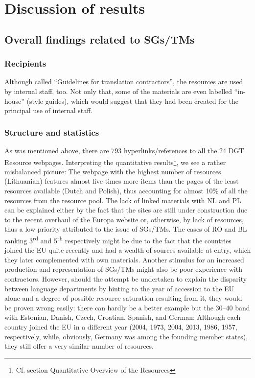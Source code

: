 \documentclass[output=paper]{langsci/langscibook}
\begin{document}
\section{Discussion of results}\label{sec:svoboda:5}

\subsection{Overall findings related to SGs/TMs}\label{sec:svoboda:5.1}

\subsubsection{Recipients}

Although called “Guidelines for translation contractors”, the resources are used by internal staff, too. Not only that, some of the materials are even labelled “in-house” (style guides), which would suggest that they had been created for the principal use of internal staff.

\subsubsection{Structure and statistics}

As was mentioned above, there are 793 hyperlinks/references to all the 24 DGT Resource webpages. Interpreting the quantitative results\footnote{Cf. section Quantitative Overview of the Resources}, we see a rather misbalanced picture: The webpage with the highest number of resources (Lithuanian) features almost five times more items than the pages of the least resources available (Dutch and Polish), thus accounting for almost 10\% of all the resources from the resource pool. The lack of linked materials with NL and PL can be explained either by the fact that the sites are still under construction due to the recent overhaul of the Europa website or, otherwise, by lack of resources, thus a low priority attributed to the issue of SGs/TMs. The cases of RO and BL ranking 3\textsuperscript{rd} and 5\textsuperscript{th} respectively might be due to the fact that the countries joined the EU quite recently and had a wealth of sources available at entry, which they later complemented with own materials. Another stimulus for an increased production and representation of SGs/TMs might also be poor experience with contractors. However, should the attempt be undertaken to explain the disparity between language departments by hinting to the year of accession to the EU alone and a degree of possible resource saturation resulting from it, they would be proven wrong easily: there can hardly be a better example but the 30–40 band with Estonian, Danish, Czech, Croatian, Spanish, and German: Although each country joined the EU in a different year (2004, 1973, 2004, 2013, 1986, 1957, respectively, while, obviously, Germany was among the founding member states), they still offer a very similar number of resources.
\end{document}
